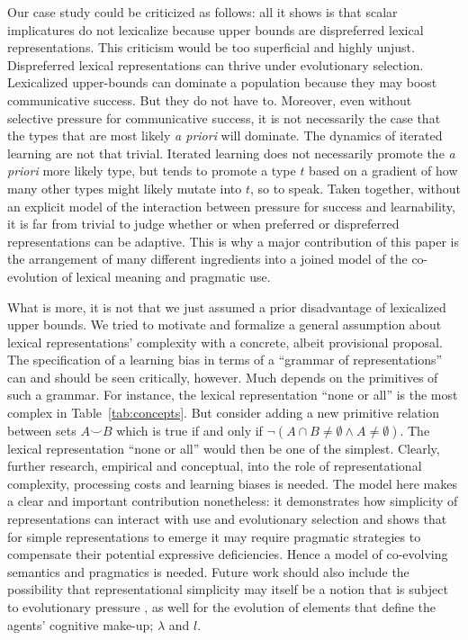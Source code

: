 \documentclass[a4paper, 11pt]{article}
\theoremstyle{Satz}
\begin{document}
Our case study could be criticized as follows: all it shows is that scalar implicatures do not
lexicalize because upper bounds are dispreferred lexical representations. This criticism would be too
superficial and highly unjust. Dispreferred lexical representations can thrive under evolutionary
selection. Lexicalized upper-bounds can dominate a population because they may boost
communicative success. But they do not have to. Moreover, even without selective pressure
for communicative success, it is not necessarily the case that the types that are most
likely \emph{a priori} will dominate. The dynamics of iterated learning are not that
trivial. Iterated learning does not necessarily promote the \emph{a priori} more likely type,
but tends to promote a type $t$ based on a gradient of how many other types might likely mutate
into $t$, so to speak. Taken together, without an explicit model of the interaction between
pressure for success and learnability, it is far from trivial to judge whether or when
preferred or dispreferred representations can be adaptive. This is why a major contribution of this
paper is the arrangement of many different ingredients into a joined model of the co-evolution
of lexical meaning and pragmatic use. 

What is more, it is not that we just assumed a prior disadvantage of lexicalized upper
bounds. We tried to motivate and formalize a general assumption about lexical representations'
complexity with a concrete, albeit provisional proposal. The specification of a learning bias
in terms of a ``grammar of representations'' can and should be seen critically, however. Much
depends on the primitives of such a grammar. For instance, the lexical representation ``none or
all'' is the most complex in Table~\ref{tab:concepts}. But consider adding a new primitive
relation between sets $A \smile B$ which is true if and only if
$\neg(A \cap B \neq \emptyset \wedge A \neq \emptyset)$. The lexical representation ``none or
all'' would then be one of the simplest. Clearly, further research, empirical and conceptual,
into the role of representational complexity, processing costs and learning biases is
needed. The model here makes a clear and important contribution nonetheless: it demonstrates
how simplicity of representations can interact with use and evolutionary selection and shows
that for simple representations to emerge it may require pragmatic strategies to compensate
their potential expressive deficiencies. Hence a model of co-evolving semantics and pragmatics is
needed. Future work should also include the possibility that representational simplicity may
itself be a notion that is subject to evolutionary pressure
\citep[cf.][]{ThompsonKirby2016:Culture-Shapes-}, as well for the evolution of elements that define
the agents' cognitive make-up; $\lambda$ and $l$.
\end{document}
